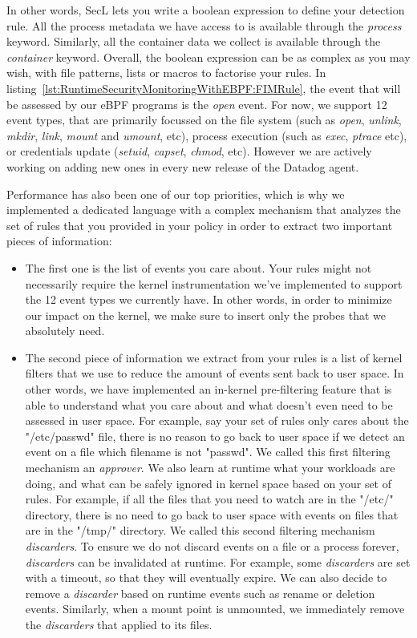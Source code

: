In other words, SecL lets you write a boolean expression to define your detection rule.
All the process metadata we have access to is available through the \emph{process} keyword.
Similarly, all the container data we collect is available through the \emph{container} keyword.
Overall, the boolean expression can be as complex as you may wish, with file patterns, lists or macros to factorise your rules.
In listing~\ref{lst:RuntimeSecurityMonitoringWithEBPF:FIMRule}, the event that will be assessed by our eBPF programs is the \emph{open} event.
For now, we support 12 event types, that are primarily focussed on the file system (such as \emph{open}, \emph{unlink}, \emph{mkdir}, \emph{link}, \emph{mount} and \emph{umount}, etc), process execution (such as \emph{exec}, \emph{ptrace} etc), or credentials update (\emph{setuid}, \emph{capset}, \emph{chmod}, etc).
However we are actively working on adding new ones in every new release of the Datadog agent.

Performance has also been one of our top priorities, which is why we implemented a dedicated language with a complex mechanism that analyzes the set of rules that you provided in your policy in order to extract two important pieces of information:

\begin{itemize}
  \item The first one is the list of events you care about.
  Your rules might not necessarily require the kernel instrumentation we’ve implemented to support the 12 event types we currently have.
  In other words, in order to minimize our impact on the kernel, we make sure to insert only the probes that we absolutely need.
  \item The second piece of information we extract from your rules is a list of kernel filters that we use to reduce the amount of events sent back to user space.
  In other words, we have implemented an in-kernel pre-filtering feature that is able to understand what you care about and what doesn't even need to be assessed in user space.
  For example, say your set of rules only cares about the "/etc/passwd" file, there is no reason to go back to user space if we detect an event on a file which filename is not "passwd".
  We called this first filtering mechanism an \emph{approver}.
  We also learn at runtime what your workloads are doing, and what can be safely ignored in kernel space based on your set of rules.
  For example, if all the files that you need to watch are in the "/etc/" directory, there is no need to go back to user space with events on files that are in the "/tmp/" directory.
  We called this second filtering mechanism \emph{discarders}.
  To ensure we do not discard events on a file or a process forever, \emph{discarders} can be invalidated at runtime.
  For example, some \emph{discarders} are set with a timeout, so that they will eventually expire.
  We can also decide to remove a \emph{discarder} based on runtime events such as rename or deletion events.
  Similarly, when a mount point is unmounted, we immediately remove the \emph{discarders} that applied to its files.
\end{itemize}

